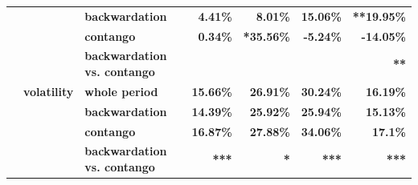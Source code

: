 \documentclass[
  authoryear,
  preprint,
  3p]{elsarticle}
\begin{document}
\begin{longtable}[t]{>{}l>{}l>{}l>{}r>{}r>{}r>{}r}
\textbf{} & \textbf{} & \textbf{backwardation} & \textcolor[HTML]{4285f4}{\textbf{4.41\%}} & \textcolor[HTML]{4285f4}{\textbf{8.01\%}} & \textcolor[HTML]{4285f4}{\textbf{15.06\%}} & \textcolor[HTML]{4285f4}{\textbf{**19.95\%}}\\
\addlinespace
\textbf{} & \textbf{} & \textbf{contango} & \textcolor[HTML]{4285f4}{\textbf{0.34\%}} & \textcolor[HTML]{4285f4}{\textbf{*35.56\%}} & \textcolor[HTML]{4285f4}{\textbf{-5.24\%}} & \textcolor[HTML]{4285f4}{\textbf{-14.05\%}}\\
\textbf{} & \textbf{} & \textbf{backwardation vs. contango} & \textcolor[HTML]{4285f4}{\textbf{}} & \textcolor[HTML]{4285f4}{\textbf{}} & \textcolor[HTML]{4285f4}{\textbf{}} & \textcolor[HTML]{4285f4}{\textbf{**}}\\
\textbf{} & \textbf{volatility} & \textbf{whole period} & \textcolor[HTML]{4285f4}{\textbf{15.66\%}} & \textcolor[HTML]{4285f4}{\textbf{26.91\%}} & \textcolor[HTML]{4285f4}{\textbf{30.24\%}} & \textcolor[HTML]{4285f4}{\textbf{16.19\%}}\\
\textbf{} & \textbf{} & \textbf{backwardation} & \textcolor[HTML]{4285f4}{\textbf{14.39\%}} & \textcolor[HTML]{4285f4}{\textbf{25.92\%}} & \textcolor[HTML]{4285f4}{\textbf{25.94\%}} & \textcolor[HTML]{4285f4}{\textbf{15.13\%}}\\
\textbf{} & \textbf{} & \textbf{contango} & \textcolor[HTML]{4285f4}{\textbf{16.87\%}} & \textcolor[HTML]{4285f4}{\textbf{27.88\%}} & \textcolor[HTML]{4285f4}{\textbf{34.06\%}} & \textcolor[HTML]{4285f4}{\textbf{17.1\%}}\\
\addlinespace
\textbf{} & \textbf{} & \textbf{backwardation vs. contango} & \textcolor[HTML]{4285f4}{\textbf{***}} & \textcolor[HTML]{4285f4}{\textbf{*}} & \textcolor[HTML]{4285f4}{\textbf{***}} & \textcolor[HTML]{4285f4}{\textbf{***}}\\
\bottomrule

\end{longtable}

\endgroup{}

\newpage

\begingroup\fontsize{7}{9}\selectfont
\end{document}
